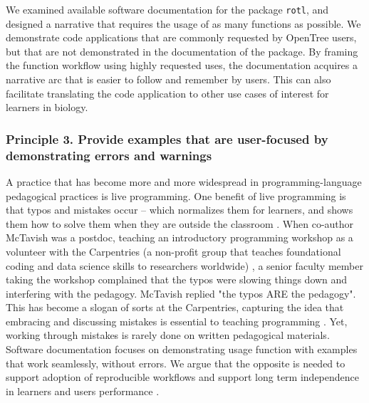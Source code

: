 \documentclass[12pt]{article}
\begin{document}
We examined available software documentation for the package \texttt{rotl},
and designed a narrative that requires the usage of as many functions as possible.
We demonstrate code applications that are commonly requested by OpenTree users,
but that are not demonstrated in the documentation of the package.
By framing the function workflow using highly requested uses, the documentation acquires a
narrative arc that is easier to follow and remember by users. This can also facilitate
translating the code application to other use cases of interest for learners in biology.


\subsubsection*{Principle 3. Provide examples that are user-focused by demonstrating errors and warnings}


A practice that has become more and more widespread in programming-language pedagogical practices
is live programming.
One benefit of live programming is that typos and mistakes occur -- which normalizes
them for learners, and shows them how to solve them when they are outside the
classroom \citep{shannon2015live, nederbragt2020ten}.
When co-author McTavish was a postdoc, teaching an introductory programming workshop as a volunteer
with the Carpentries (a non-profit group that teaches foundational coding and
 data science skills to researchers worldwide) \citep{wilson2006swc, SWCwebsite},
a senior faculty member taking the workshop
complained that the typos were slowing things down and interfering with the pedagogy.
McTavish replied "the typos ARE the pedagogy".
This has become a slogan of sorts at the Carpentries, capturing the idea that embracing
and discussing mistakes is essential to teaching programming \citep{wilson2019teaching}.
Yet, working through mistakes is rarely done on written pedagogical materials.
Software documentation focuses on demonstrating usage function with examples that
work seamlessly, without errors. We argue that the opposite is needed to support
adoption of reproducible workflows and support long term independence in learners
and users performance \citep{gaspar2007restoring, steele2014error}.
\end{document}
